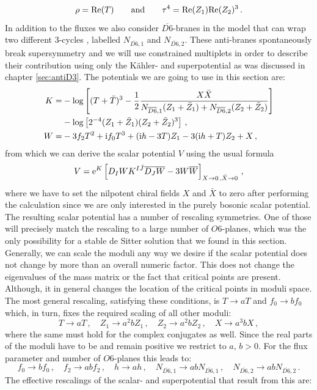 \documentclass[a4paper,12pt]{report}
\newcommand{\be}{\begin{equation}}
\newcommand{\ee}{\end{equation}}
\newcommand{\bea}{\begin{equation}\begin{aligned}}
\newcommand{\eea}{\end{aligned}\end{equation}}
\def\rmi{{\rm i}}
\def\rme{{\rm e}}
\def\rmre{{\rm Re}}
\begin{document}
\be 
\rho = \rmre(T) \qquad \text{and} \qquad \tau^4 = \rmre(Z_1) \rmre(Z_2)^ 3\,.
\ee
In addition to the fluxes we also consider $\overline{D6}$-branes in the model that can wrap two different $3$-cycles \cite{Kallosh:2018nrk}, labelled $N_{\overline{D6},1}$ and $N_{\overline{D6},2}$. These anti-branes spontaneously break supersymmetry and we will use constrained multiplets in order to describe their contribution using only the Kähler- and superpotential as was discussed in chapter \ref{sec:antiD3}. The potentials we are going to use in this section are:
\bea 
K =& -\log\left[(T+\bar{T})^ 3 - \frac{1}{2} \frac{X \bar{X}}{ N_{\overline{D6},1}(Z_1 + \bar{Z}_1) + N_{\overline{D6},2}(Z_2 + \bar{Z}_2)}\right] \\
&- \log\left[2^ {-4} (Z_1 + \bar{Z}_1)(Z_2 + \bar{Z}_2)^ 3\right]\,,\\
W =& -3 f_2 T^ 2 + \rmi f_0 T^ 3 + (\rmi h - 3T) Z_1 - 3(\rmi h+T)Z_2 + X\,,
\eea
from which we can derive the scalar potential $V$ using the usual formula
\be 
V = \rme^ K \left[D_I W K^ {I\bar{J}} \overline{D_J W} - 3 W \overline{W}\right]_{X\to 0\,,\bar{X} \to 0}\,,
\ee
where we have to set the nilpotent chiral fields $X$ and $\bar{X}$ to zero after performing the calculation since we are only interested in the purely bosonic scalar potential.\\
The resulting scalar potential has a number of rescaling symmetries. One of those will precisely match the rescaling to a large number of $O6$-planes, which was the only possibility for a stable de Sitter solution that we found in this section. Generally, we can scale the moduli any way we desire if the scalar potential does not change by more than an overall numeric factor. This does not change the eigenvalues of the mass matrix or the fact that critical points are present. Although, it in general changes the location of the critical points in moduli space. The most general rescaling, satisfying these conditions, is $T \to aT$ and $f_0 \to b f_0$ which, in turn, fixes the required scaling of all other moduli:
\be 
T\to aT\,, \quad Z_1 \to a^ 2 b Z_1\,, \quad Z_2 \to a^ 2 b Z_2\,,\quad X \to a^ 3 b X\,,
\ee
where the same must hold for the complex conjugates as well. Since the real parts of the moduli have to be and remain positive we restrict to $a,\,b>0$. For the flux parameter and number of $O6$-planes this leads to:
\be 
f_0 \to b f_0\,,\quad f_2 \to abf_2\,,\quad h\to ah\,,\quad N_{\overline{D6},1} \to ab N_{\overline{D6},1}\,,\quad N_{\overline{D6},2} \to ab N_{\overline{D6},2}\,.
\ee
The effective rescalings of the scalar- and superpotential that result from this are:
\end{document}
